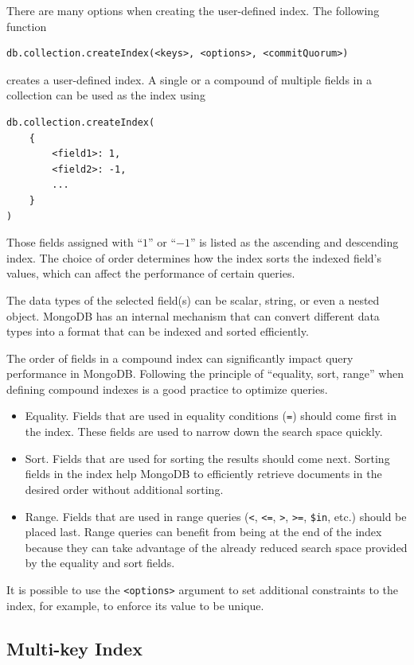 There are many options when creating the user-defined index. The following function 
\begin{lstlisting}
db.collection.createIndex(<keys>, <options>, <commitQuorum>)
\end{lstlisting}
creates a user-defined index. A single or a compound of multiple fields in a collection can be used as the index using
\begin{lstlisting}
db.collection.createIndex(
	{
		<field1>: 1,
		<field2>: -1,
		...
	}
)
\end{lstlisting}
Those fields assigned with ``$1$'' or ``$-1$'' is listed as the ascending and descending index. The choice of order determines how the index sorts the indexed field's values, which can affect the performance of certain queries.

The data types of the selected field(s) can be scalar, string, or even a nested object. MongoDB has an internal mechanism that can convert different data types into a format that can be indexed and sorted efficiently.

The order of fields in a compound index can significantly impact query performance in MongoDB. Following the principle of ``equality, sort, range'' when defining compound indexes is a good practice to optimize queries.

\begin{itemize}
	\item Equality. Fields that are used in equality conditions (\verb|=|) should come first in the index. These fields are used to narrow down the search space quickly.
	\item Sort. Fields that are used for sorting the results should come next. Sorting fields in the index help MongoDB to efficiently retrieve documents in the desired order without additional sorting.
	\item Range. Fields that are used in range queries (\verb|<|, \verb|<=|, \verb|>|, \verb|>=|, \verb|$in|, etc.) should be placed last. Range queries can benefit from being at the end of the index because they can take advantage of the already reduced search space provided by the equality and sort fields.
\end{itemize}

It is possible to use the \verb|<options>| argument to set additional constraints to the index, for example, to enforce its value to be unique.

\subsection{Multi-key Index}

